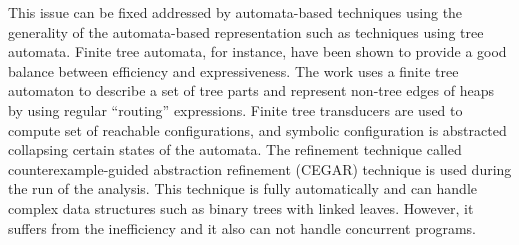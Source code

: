  
 This issue can be fixed addressed by automata-based techniques using the generality of the automata-based representation such as techniques using tree automata. Finite tree automata, for instance, have been shown to provide a good balance between efficiency and expressiveness. The work \cite{Ahmed:TreeAutomata} uses a finite tree automaton to describe a set of tree parts and represent non-tree edges of heaps by using regular “routing” expressions. Finite tree transducers
are used to compute set of reachable configurations, and symbolic configuration is abstracted
collapsing certain states of the automata. The refinement technique called counterexample-guided
abstraction refinement (CEGAR) technique is used during the run of the analysis. This technique
is fully automatically and can handle complex data structures such as binary trees with linked
leaves. However, it suffers from the inefficiency and it also can not handle concurrent programs.


